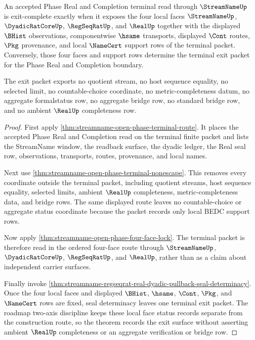 \begin{theorem}
\label{thm:streamname-terminal-four-face-exit-completeness}
An accepted Phase Real and Completion terminal read through $\StreamNameUp$ is exit-complete exactly when it exposes the four local faces $\StreamNameUp$, $\DyadicRatCoreUp$, $\RegSeqRatUp$, and $\RealUp$ together with the displayed $\BHist$ observations, componentwise $\hsame$ transports, displayed $\Cont$ routes, $\Pkg$ provenance, and local $\NameCert$ support rows of the terminal packet. Conversely, those four faces and support rows determine the terminal exit packet for the Phase Real and Completion boundary.

The exit packet exports no quotient stream, no host sequence equality, no selected limit, no countable-choice coordinate, no metric-completeness datum, no aggregate formalstatus row, no aggregate bridge row, no standard bridge row, and no ambient $\RealUp$ completeness row.
\end{theorem}
\begin{proof}
First apply \autoref{thm:streamname-open-phase-terminal-route}. It places the accepted Phase Real and Completion read on the terminal finite packet and lists the StreamName window, the readback surface, the dyadic ledger, the Real seal row, observations, transports, routes, provenance, and local names.

Next use \autoref{thm:streamname-open-phase-terminal-nonescape}. This removes every coordinate outside the terminal packet, including quotient streams, host sequence equality, selected limits, ambient $\RealUp$ completeness, metric-completeness data, and bridge rows. The same displayed route leaves no countable-choice or aggregate status coordinate because the packet records only local BEDC support rows.

Now apply \autoref{thm:streamname-open-phase-four-face-lock}. The terminal packet is therefore read in the ordered four-face route through $\StreamNameUp$, $\DyadicRatCoreUp$, $\RegSeqRatUp$, and $\RealUp$, rather than as a claim about independent carrier surfaces.

Finally invoke \autoref{thm:streamname-regseqrat-real-dyadic-pullback-seal-determinacy}. Once the four local faces and displayed $\BHist$, $\hsame$, $\Cont$, $\Pkg$, and $\NameCert$ rows are fixed, seal determinacy leaves one terminal exit packet. The roadmap two-axis discipline keeps these local face status records separate from the construction route, so the theorem records the exit surface without asserting ambient $\RealUp$ completeness or an aggregate verification or bridge row.
\end{proof}

